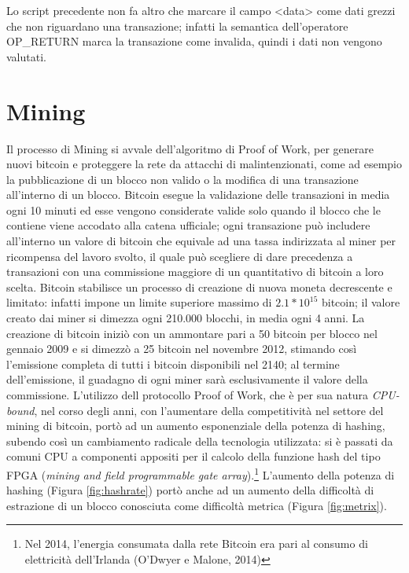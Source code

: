 Lo script precedente non fa altro che marcare il campo <data> come dati grezzi che non riguardano una transazione; infatti la semantica dell’operatore OP\_RETURN marca la transazione come invalida, quindi i dati non vengono valutati.

\section{Mining}
\label{sec:miningbitcoin}

Il processo di Mining si avvale dell’algoritmo di Proof of Work, per generare nuovi bitcoin e proteggere la rete da attacchi di malintenzionati, come ad esempio la pubblicazione di un blocco non valido o la modifica di una transazione all’interno di un blocco.\newline
Bitcoin esegue la validazione delle transazioni in media ogni 10 minuti ed esse vengono considerate valide solo quando il blocco che le contiene viene accodato alla catena ufficiale; ogni transazione può includere all’interno un valore di bitcoin che equivale ad una tassa indirizzata al miner per ricompensa del lavoro svolto, il quale può scegliere di dare precedenza a transazioni con una commissione maggiore di un quantitativo di bitcoin a loro scelta.\newline
Bitcoin stabilisce un processo di creazione di nuova moneta decrescente e limitato: infatti impone un limite superiore massimo di \(2.1 * 10^{15} \) bitcoin; il valore creato dai miner si dimezza ogni 210.000 blocchi, in media ogni 4 anni.
La creazione di bitcoin iniziò con un ammontare pari a 50 bitcoin per blocco nel gennaio 2009 e si dimezzò a 25 bitcoin nel novembre 2012, stimando così l’emissione completa di tutti i bitcoin disponibili nel 2140; al termine dell’emissione, il guadagno di ogni miner sarà esclusivamente il valore della commissione.
L’utilizzo dell protocollo Proof of Work, che è per sua natura {\it CPU-bound\/}, nel corso degli anni, con l’aumentare della competitività nel settore del mining di bitcoin, portò ad un aumento esponenziale della potenza di hashing, subendo così un cambiamento radicale della tecnologia utilizzata: si è passati da comuni CPU a componenti appositi per il calcolo della funzione hash del tipo FPGA (\emph{mining and field programmable gate array}).\footnote{Nel 2014, l'energia consumata dalla rete Bitcoin era pari al consumo di elettricità dell'Irlanda (O'Dwyer e Malone, 2014)}
L’aumento della potenza di hashing (Figura \ref{fig:hashrate}) portò anche ad un aumento della difficoltà di estrazione di un blocco conosciuta come difficoltà metrica (Figura \ref{fig:metrix}).


